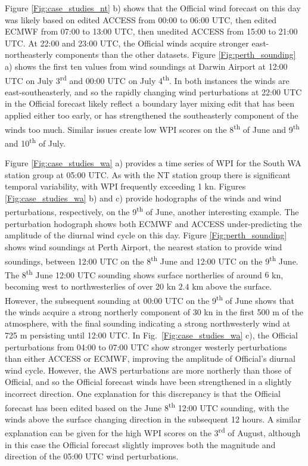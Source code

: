 \documentclass[twocol]{ametsoc}
\begin{document}
Figure \ref{Fig:case_studies_nt} b) shows that the Official wind forecast on this day was likely based on edited ACCESS from 00:00 to 06:00 UTC, then edited ECMWF from 07:00 to 13:00 UTC, then unedited ACCESS from 15:00 to 21:00 UTC. At 22:00 and 23:00 UTC, the Official winds acquire stronger east-northeasterly components than the other datasets. Figure \ref{Fig:perth_sounding} a) shows the first ten values from wind soundings at Darwin Airport at 12:00 UTC on July 3\textsuperscript{rd} and 00:00 UTC on July 4\textsuperscript{th}. In both instances the winds are east-southeasterly, and so the rapidly changing wind perturbations at 22:00 UTC in the Official forecast likely reflect a boundary layer mixing edit that has been applied either too early, or has strengthened the southeasterly component of the winds too much. Similar issues create low WPI scores on the 8\textsuperscript{th} of June and 9\textsuperscript{th} and 10\textsuperscript{th} of July.

Figure \ref{Fig:case_studies_wa} a) provides a time series of WPI for the South WA station group at 05:00 UTC. As with the NT station group there is significant temporal variability, with WPI frequently exceeding 1 kn. Figures \ref{Fig:case_studies_wa} b) and c) provide hodographs of the winds and wind perturbations, respectively, on the 9\textsuperscript{th} of June, another interesting example. The perturbation hodograph shows both ECMWF and ACCESS under-predicting the amplitude of the diurnal wind cycle on this day. Figure \ref{Fig:perth_sounding} shows wind soundings at Perth Airport, the nearest station to provide wind soundings, between 12:00 UTC on the 8\textsuperscript{th} June and 12:00 UTC on the 9\textsuperscript{th} June. The 8\textsuperscript{th} June 12:00 UTC sounding shows surface northerlies of around $6$ kn, becoming west to northwesterlies of over 20 kn $2.4$ km above the surface. However, the subsequent sounding at 00:00 UTC on the 9\textsuperscript{th} of June shows that the winds acquire a strong northerly component of 30 kn in the first 500 m of the atmosphere, with the final sounding indicating a strong northwesterly wind at 725 m persisting until 12:00 UTC. In Fig.~\ref{Fig:case_studies_wa} c), the Official perturbations from 04:00 to 07:00 UTC show stronger westerly perturbations than either ACCESS or ECMWF, improving the amplitude of Official's diurnal wind cycle. However, the AWS perturbations are more northerly than those of Official, and so the Official forecast winds have been strengthened in a slightly incorrect direction. One explanation for this discrepancy is that the Official forecast has been edited based on the June 8\textsuperscript{th} 12:00 UTC sounding, with the winds above the surface changing direction in the subsequent 12 hours. A similar explanation can be given for the high WPI scores on the  3\textsuperscript{rd} of August, although in this case the Official forecast slightly improves both the magnitude and direction of the 05:00 UTC wind perturbations.
\end{document}
